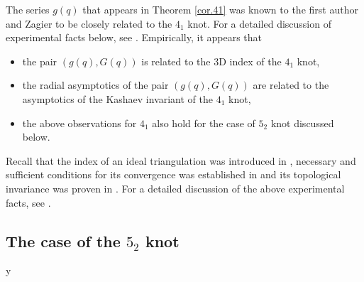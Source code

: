 \documentclass[12pt]{amsart}
\theoremstyle{definition}
\def\printname#1{
        \if\draft y
                \smash{\makebox[0pt]{\hspace{-0.5in}
                        \raisebox{8pt}{\tt\tiny #1}}}
        \fi
}
\def\lbl#1{\label{#1}\printname{#1}}
\begin{document}
The series $g(q)$ that appears in Theorem \ref{cor.41} was known to
the first author and Zagier to be closely related to the $4_1$ knot. 
For a detailed discussion of experimental facts below, see \cite{GZ2}.
Empirically, it appears that
\begin{itemize}
\item
the pair $(g(q),G(q))$ is related to the 3D index of the $4_1$ knot, 
\item
the radial asymptotics of the pair $(g(q),G(q))$ are related to
the asymptotics of the Kashaev invariant of the $4_1$ knot, 
\item
the above observations for $4_1$ also hold for the case of $5_2$ knot
discussed below.
\end{itemize}
Recall that the index of an ideal triangulation was introduced in 
\cite{DGG1,DGG2}, necessary and sufficient conditions for its
convergence was established in \cite{Ga:index} and its topological invariance
was proven in \cite{GHRS}. For a detailed discussion of the above
experimental facts, see \cite{GZ2}.


\subsection{The case of the $5_2$ knot}
\lbl{sub.52}
\end{document}
